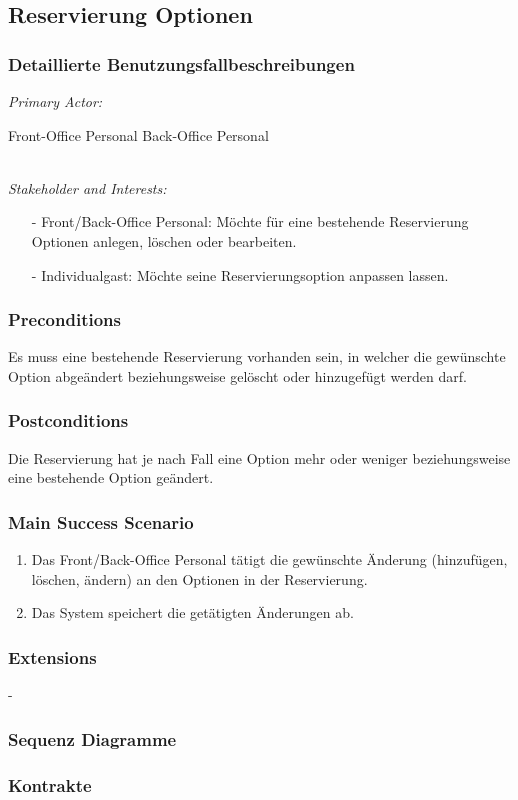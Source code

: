 \documentclass[./detailed_overview_usecases.tex]{subfiles}
\begin{document}
    \subsection{Reservierung Optionen}
    \subsubsection{Detaillierte Benutzungsfallbeschreibungen}
    \textit{Primary Actor:}
    \begin{enumerate}
        Front-Office Personal
        Back-Office Personal
    \end{enumerate}
    \\
    \textit{Stakeholder and Interests:}
    \begin{itemize}
        \item[-] Front/Back-Office Personal: Möchte für eine bestehende Reservierung Optionen anlegen, löschen oder bearbeiten.
        \item[-] Individualgast: Möchte seine Reservierungsoption anpassen lassen.
    \end{itemize}

    \subsubsection*{Preconditions}
    Es muss eine bestehende Reservierung vorhanden sein, in welcher die gewünschte Option abgeändert beziehungsweise gelöscht oder hinzugefügt werden darf.

    \subsubsection*{Postconditions}
    Die Reservierung hat je nach Fall eine Option mehr oder weniger beziehungsweise eine bestehende Option geändert.

    \subsubsection*{Main Success Scenario}
    \begin{enumerate}
        \item Das Front/Back-Office Personal tätigt die gewünschte Änderung (hinzufügen, löschen, ändern) an den Optionen in der Reservierung.
        \item Das System speichert die getätigten Änderungen ab.
    \end{enumerate}

    \subsubsection*{Extensions}
    -
    \subsubsection{Sequenz Diagramme}
    \subsubsection{Kontrakte}
\end{document}
